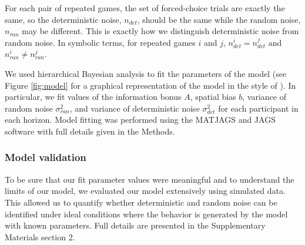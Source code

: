 \documentclass[12pt]{article}
\begin{document}
{%

For each pair of repeated games, the set of forced-choice trials are exactly the same, so the deterministic noise, $n_{det}$, should be the same while the random noise, $n_{ran}$ may be different. This is exactly how we distinguish deterministic noise from random noise. In symbolic terms, for repeated games $i$ and $j$,  $n_{det}^i=n_{det}^j$  and $n_{ran}^i \neq n_{ran}^j$.  

We used hierarchical Bayesian analysis to fit the parameters of the model (see Figure \ref{fig:model} for a graphical representation of the model in the style of \cite{lee2014}). In particular, we fit values of the information bonus $A$, spatial bias $b$, variance of random noise $\sigma_{ran}^2$, and variance of deterministic noise $\sigma_{det}^2$ for each participant in each horizon. Model fitting was performed using the MATJAGS and JAGS software \citep{jags, matjags} with full details given in the Methods.  


\subsubsection*{Model validation}
To be sure that our fit parameter values were meaningful and to understand the limits of our model, we evaluated our model extensively using simulated data. This allowed us to quantify whether deterministic and random noise can be identified under ideal conditions where the behavior is generated by the model with known parameters. Full details are presented in the Supplementary Materials section 2. 
	
}
\end{document}
